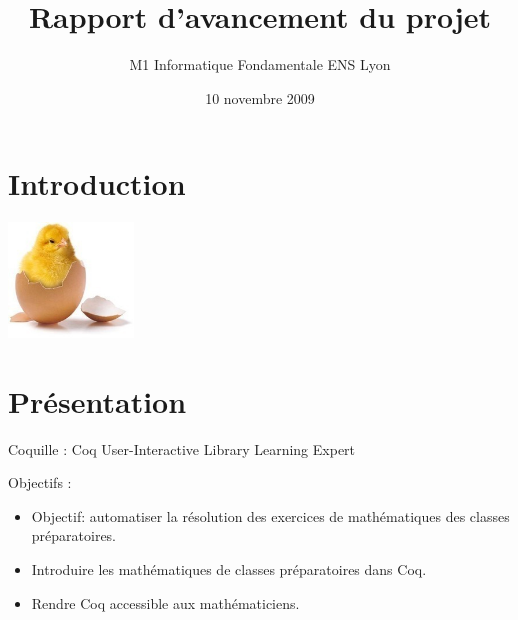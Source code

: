 \documentclass[slidetop]{beamer}
\date{10 novembre 2009}
\title{Rapport d'avancement du projet \coquille{}} %
\author{M1 Informatique Fondamentale ENS Lyon}
\begin{document}
\section{Introduction}
\begin{frame}
\maketitle
\center
\includegraphics[width=0.25\textwidth]{poussin.jpg}

\end{frame}

\begin{frame}
\tableofcontents

\end{frame}

\section{Présentation}
\begin{frame}
Coquille : Coq User-Interactive Library Learning Expert

Objectifs :
\begin{itemize}
  \item Objectif: automatiser la résolution des exercices de mathématiques des classes préparatoires.
  \item Introduire les mathématiques de classes préparatoires dans Coq. 
  \item Rendre Coq accessible aux mathématiciens. %
\end{itemize}


\end{frame}
\end{document}
